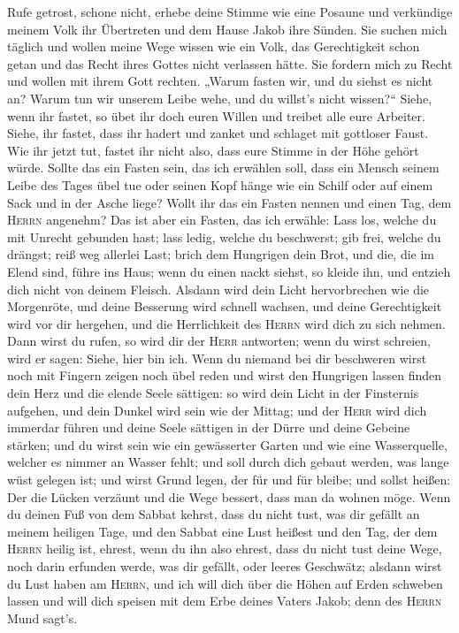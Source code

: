  Rufe getrost, schone nicht, erhebe deine Stimme wie eine
Posaune und verkündige meinem Volk ihr Übertreten und dem Hause Jakob
ihre Sünden.  Sie suchen mich täglich und wollen meine
Wege wissen wie ein Volk, das Gerechtigkeit schon getan und das Recht
ihres Gottes nicht verlassen hätte. Sie fordern mich zu Recht und wollen
mit ihrem Gott rechten.  „Warum fasten wir, und du siehst
es nicht an? Warum tun wir unserem Leibe wehe, und du willst's nicht
wissen?{}`` Siehe, wenn ihr fastet, so übet ihr doch euren Willen und
treibet alle eure Arbeiter.  Siehe, ihr fastet, dass ihr
hadert und zanket und schlaget mit gottloser Faust. Wie ihr jetzt tut,
fastet ihr nicht also, dass eure Stimme in der Höhe gehört würde.
 Sollte das ein Fasten sein, das ich erwählen soll, dass
ein Mensch seinem Leibe des Tages übel tue oder seinen Kopf hänge wie
ein Schilf oder auf einem Sack und in der Asche liege? Wollt ihr das ein
Fasten nennen und einen Tag, dem \textsc{Herrn} angenehm? 
Das ist aber ein Fasten, das ich erwähle: Lass los, welche du mit
Unrecht gebunden hast; lass ledig, welche du beschwerst; gib frei,
welche du drängst; reiß weg allerlei Last;  brich dem
Hungrigen dein Brot, und die, die im Elend sind, führe ins Haus; wenn du
einen nackt siehst, so kleide ihn, und entzieh dich nicht von deinem
Fleisch.  Alsdann wird dein Licht hervorbrechen wie die
Morgenröte, und deine Besserung wird schnell wachsen, und deine
Gerechtigkeit wird vor dir hergehen, und die Herrlichkeit des
\textsc{Herrn} wird dich zu sich nehmen.  Dann wirst du
rufen, so wird dir der \textsc{Herr} antworten; wenn du wirst schreien,
wird er sagen: Siehe, hier bin ich. Wenn du niemand bei dir beschweren
wirst noch mit Fingern zeigen noch übel reden  und wirst
den Hungrigen lassen finden dein Herz und die elende Seele sättigen: so
wird dein Licht in der Finsternis aufgehen, und dein Dunkel wird sein
wie der Mittag;  und der \textsc{Herr} wird dich immerdar
führen und deine Seele sättigen in der Dürre und deine Gebeine stärken;
und du wirst sein wie ein gewässerter Garten und wie eine Wasserquelle,
welcher es nimmer an Wasser fehlt;  und soll durch dich
gebaut werden, was lange wüst gelegen ist; und wirst Grund legen, der
für und für bleibe; und sollst heißen: Der die Lücken verzäunt und die
Wege bessert, dass man da wohnen möge.  Wenn du deinen
Fuß von dem Sabbat kehrst, dass du nicht tust, was dir gefällt an meinem
heiligen Tage, und den Sabbat eine Lust heißest und den Tag, der dem
\textsc{Herrn} heilig ist, ehrest, wenn du ihn also ehrest, dass du
nicht tust deine Wege, noch darin erfunden werde, was dir gefällt, oder
leeres Geschwätz;  alsdann wirst du Lust haben am
\textsc{Herrn}, und ich will dich über die Höhen auf Erden schweben
lassen und will dich speisen mit dem Erbe deines Vaters Jakob; denn des
\textsc{Herrn} Mund sagt's.

